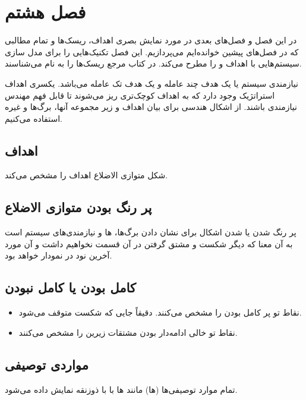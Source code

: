 \newpage

\section{فصل هشتم}

در این فصل و فصل‌های بعدی در مورد نمایش بصری اهداف، ریسک‌ها و تمام مطالبی که در
فصل‌های پیشین خوانده‌ایم می‌پردازیم. این فصل تکنیک‌هایی را برای مدل سازی
سیستم‌هایی با اهداف  و  را مطرح می‌کند. در کتاب مرجع ریسک‌ها را
به نام  می‌شناسند.

نیازمندی سیستم یا  یک هدف چند عامله و  یک هدف تک عامله می‌باشد. یکسری اهداف استراتژیک وجود دارد که به
اهداف کوچک‌تری ریز می‌شوند تا قابل فهم مهندس نیازمندی باشند. از اشکال هندسی برای
بیان اهداف و زیر مجموعه آنها، برگ‌ها و غیره استفاده می‌کنیم.

\subsection{اهداف}

شکل متوازی الاضلاع اهداف را مشخص می‌کند.

\subsection{پر رنگ بودن متوازی الاضلاع}

پر رنگ شدن یا  شدن اشکال برای نشان دادن برگ‌ها، ها و
نیازمندی‌های سیستم است به آن معنا که دیگر شکست و مشتق گرفتن در آن قسمت نخواهیم
داشت و آن مورد آخرین نود در نمودار خواهد بود.

\subsection{کامل بودن یا کامل نبودن }

\begin{itemize}
    \item نقاط تو پر کامل بودن را مشخص می‌کنند. دقیقاً جایی که شکست متوقف
    می‌شود.
    \item نقاط تو خالی ادامه‌دار بودن مشتقات زیرین را مشخص می‌کنند.
\end{itemize}

\subsection{مواردی توصیفی}

تمام موارد توصیفی‌ها (ها) مانند  ها با با
ذوزنقه نمایش داده می‌شود.

